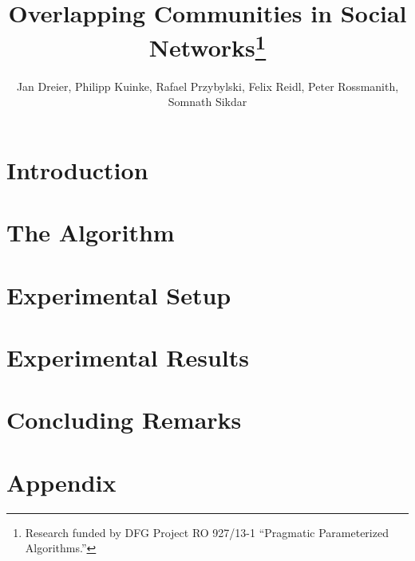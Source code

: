 \documentclass[runningheads,a4paper,11pt]{llncs}
\title{Overlapping Communities in Social Networks\thanks{Research 
funded by DFG Project RO 927/13-1 ``Pragmatic Parameterized Algorithms.''}}
\author{Jan Dreier, 
Philipp Kuinke, 
Rafael Przybylski,
Felix Reidl, 
Peter Rossmanith, 
Somnath Sikdar
}
\institute{Theoretical Computer Science, \\ 
RWTH Aachen University, \\
52074 Aachen Germany}
\begin{document}
\maketitle

\begin{abstract}

\end{abstract}

\section{Introduction}


\section{The Algorithm} \label{sec:algorithm}


\section{Experimental Setup} \label{sec:experiment_setup}



\section{Experimental Results}\label{sec:experiment_results}




%

\section{Concluding Remarks} \label{sec:conclusions}

\def\redefineme{
    \def\LNCS{LNCS}%
    \def\ICALP##1{Proc. of ##1 ICALP}%
    \def\FOCS##1{Proc. of ##1 FOCS}%
    \def\COCOON##1{Proc. of ##1 COCOON}%
    \def\SODA##1{Proc. of ##1 SODA}%
    \def\SWAT##1{Proc. of ##1 SWAT}%
    \def\IWPEC##1{Proc. of ##1 IWPEC}%
    \def\IWOCA##1{Proc. of ##1 IWOCA}%
    \def\ISAAC##1{Proc. of ##1 ISAAC}%
    \def\STACS##1{Proc. of ##1 STACS}%
    \def\ESA##1{Proc. of ##1 ESA}%
    \def\WG##1{Proc. of ##1 WG}%
    \def\LIPIcs##1{LIPIcs}%
    \def\LIPIcs{LIPIcs}%
    \def\LICS##1{Proc. of ##1 LICS}%
}

%



\newpage

\section*{Appendix}


\end{document}
